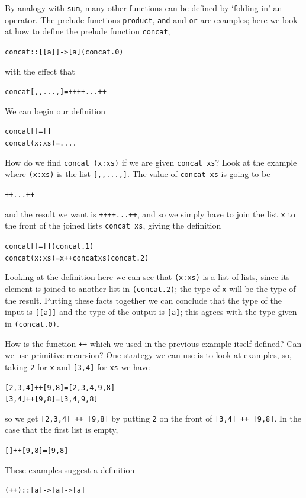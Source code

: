 \begin{example}
By analogy with \texttt{sum}, many other functions can be defined by
`folding in' an operator. The prelude functions \texttt{product},
\texttt{and} and \texttt{or} are examples; here we look at how to define
the prelude function \texttt{concat},
\begin{alltt}
concat :: [[a]] -> [a]\hfill(concat.0)
\end{alltt}
with the effect that 
\begin{alltt}
concat [\eone,\etwo,...,] = \eone++\etwo++...++
\end{alltt}
We can begin our definition
\begin{alltt}
concat []     = []
concat (x:xs) = ....
\end{alltt}
How do we find \texttt{concat (x:xs)} if we are given \texttt{concat
xs}? Look at the example where \texttt{(x:xs)} is the list 
\texttt{[\eone,\etwo,...,]}. The value of \texttt{concat xs} is going to be
\begin{alltt}
\etwo++...++
\end{alltt} and the result we want is 
\texttt{\eone++\etwo++...++}, and so we simply have to join 
the list \texttt{x} to the front of the
joined lists \texttt{concat xs}, giving the definition
\begin{alltt}
concat []     = []\hfill(concat.1)
concat (x:xs) = x ++ concat xs\hfill(concat.2)
\end{alltt}
Looking at the definition here we can see that \texttt{(x:xs)} is a list
of lists, since its element is joined to another list in
\texttt{(concat.2)}; the type of \texttt{x} will be the type of the
result. Putting these facts together we can conclude that the type of
the input is \texttt{[[a]]} and the type of the output is \texttt{[a]};
this agrees with the type given in \texttt{(concat.0)}.

How is the function \texttt{++}\minx{++} which we used in the previous
example itself defined? Can we use primitive
recursion? One strategy we can use is to look at examples, so, taking
\texttt{2} for \texttt{x} and \texttt{[3,4]} for \texttt{xs} we have
\begin{alltt}
[2,3,4] ++ [9,8] = [2,3,4,9,8]             
  [3,4] ++ [9,8] = [3,4,9,8]
\end{alltt}
so we get \texttt{[2,3,4] ++ [9,8]} by
putting \texttt{2} on the front of \texttt{[3,4] ++ [9,8]}.
In the case that the first list is empty,
\begin{alltt}
     [] ++ [9,8] = [9,8]
\end{alltt}
These examples suggest a definition
\begin{alltt}
(++) :: [a] -> [a] -> [a]


\end{alltt}
\end{example}
